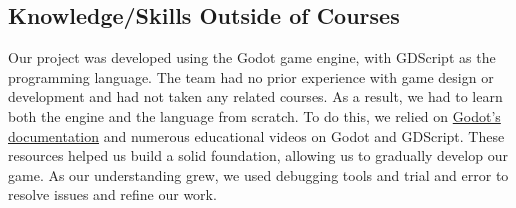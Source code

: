 \documentclass{article}
\begin{document}
\subsection{Knowledge/Skills Outside of Courses}


Our project was developed using the Godot game engine, with GDScript as the programming language. The team had no prior experience with game design or development and had not taken any related courses. As a result, we had to learn both the engine and the language from scratch. To do this, we relied on \href{https://docs.godotengine.org/}{Godot's documentation} and numerous educational videos on Godot and GDScript. These resources helped us build a solid foundation, allowing us to gradually develop our game. As our understanding grew, we used debugging tools and trial and error to resolve issues and refine our work.
\end{document}
